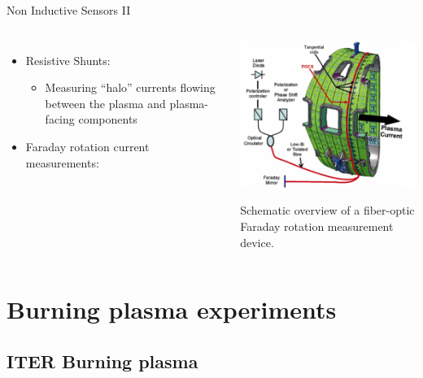 \documentclass{beamer}
\begin{document}
\begin{frame}{Non Inductive Sensors II}{}
	\begin{columns}
  	     	\begin{itemize}
			\item Resistive Shunts:
 		     	\begin{itemize}
				\item  Measuring “halo” currents flowing between the plasma and plasma-facing components
			\end{itemize}		
			\item Faraday  rotation current  measurements:
		\end{itemize}
			\begin{center}
				\includegraphics[width=0.8 \columnwidth]{Faraday.png}
				
				{\tiny  Schematic overview of a fiber-optic Faraday rotation measurement device.}
			\end{center}
 	 \end{columns}  	
\end{frame}

\section{Burning plasma experiments}
\subsection{ITER Burning plasma}
\end{document}
